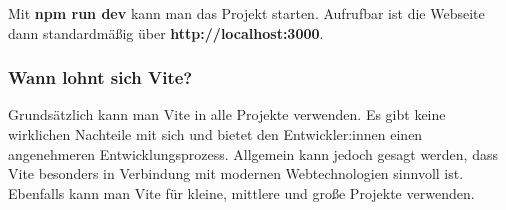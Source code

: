 Mit \textbf{npm run dev} kann man das Projekt starten. Aufrufbar ist die Webseite dann standardmäßig über \textbf{http://localhost:3000}.
\cite{frontend_vite}

\subsubsection{Wann lohnt sich Vite?}
Grundsätzlich kann man Vite in alle Projekte verwenden. Es gibt keine wirklichen Nachteile mit sich und bietet den Entwickler:innen einen angenehmeren Entwicklungsprozess. Allgemein kann jedoch gesagt werden, dass Vite besonders in Verbindung mit modernen Webtechnologien sinnvoll ist. Ebenfalls kann man Vite für kleine, mittlere und große Projekte verwenden.
\cite{frontend_vite}